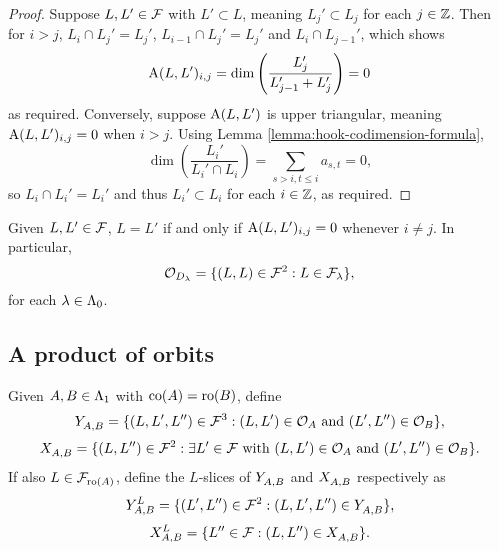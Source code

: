 \documentclass[a4paper, 11pt]{report}
\begin{document}
\begin{proof}
Suppose $L,L'\in\flags$ with $L'\subset L$, meaning $L_j'\subset L_j$ for each $j\in\integers$. Then for $i>j$, $L_i\cap L_j' = L_j'$, $L_{i-1}\cap L_j' = L_j'$ and $L_i\cap L_{j-1}'$, which shows
\begin{equation*}
\type{L}{L'}_{i,j} = \dim\left(\frac{L_j'}{L_{j-1}'+L_j'}\right) = 0
\end{equation*}
as required. Conversely, suppose $\type{L}{L'}$ is upper triangular, meaning $\type{L}{L'}_{i,j}=0$ when $i>j$. Using Lemma \ref{lemma:hook-codimension-formula},
\begin{equation*}
\dim\left(\frac{L_i'}{L_i'\cap L_i}\right) = \sum_{s>i,t\le i} a_{s,t} = 0,
\end{equation*}
so $L_i\cap L_i' = L_i'$ and thus $L_i'\subset L_i$ for each $i\in\integers$, as required.
\end{proof}

\begin{corollary}\label{corollary:diagonal-orbits}
Given $L,L'\in\flags$, $L=L'$ if and only if $\type{L}{L'}_{i,j}=0$ whenever $i\neq j$. In particular,
\begin{equation*}
\orbit{\diag{\lambda}} = \{(L,L)\in\flags^2: L\in\flags_\lambda\},
\end{equation*}
for each $\lambda\in\compositions$.
\end{corollary}

\subsection{A product of orbits}

Given $A,B\in\matrices$ with $\co{A}=\ro{B}$, define
\begin{equation*}
\yprod{A,B} = \{ (L,L',L'')\in\flags^3: (L,L')\in\orbit{A} \text{ and } (L',L'')\in\orbit{B}\},
\end{equation*}
\begin{equation*}
\xprod{A,B} = \{(L,L'')\in\flags^2:\exists L'\in\flags\text{ with } (L,L')\in\orbit{A} \text{ and } (L',L'')\in\orbit{B}\}.
\end{equation*}
If also $L\in\flags_{\ro{A}}$, define the $L$-slices of $\yprod{A,B}$ and $\xprod{A,B}$ respectively as
\begin{equation*}
\yprod[L]{A,B} = \{(L',L'')\in\flags^2: (L,L',L'')\in\yprod{A,B}\},
\end{equation*}
\begin{equation*}
\xprod[L]{A,B} = \{L''\in\flags: (L,L'')\in\xprod{A,B}\}.
\end{equation*}
\end{document}
